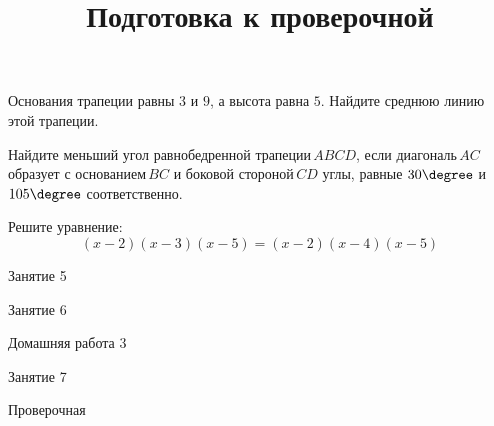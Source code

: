 \begin{homework}[number=2]
\begin{listofex}
		\item Основания трапеции равны \( 3 \) и \( 9 \), а высота равна \( 5 \). Найдите среднюю линию этой трапеции.
		\item Найдите меньший угол равнобедренной трапеции \( ABCD \), если диагональ \( AC \) образует с основанием \( BC \) и боковой стороной \( CD \) углы, равные \( 30\degree \) и \( 105\degree \) соответственно.
		\item Решите уравнение:
		\[(x-2)(x-3)(x-5)=(x-2)(x-4)(x-5)\]
	\end{listofex}
\end{homework}

\begin{class}[number=5]
	\begin{listofex}
		\item Занятие 5
	\end{listofex}
\end{class}

\begin{class}[number=6]
	\begin{listofex}
		\item Занятие 6
	\end{listofex}
\end{class}

\begin{homework}[number=3]
	\begin{listofex}
		\item Домашняя работа 3
	\end{listofex}
\end{homework}

\begin{class}[number=7]
	\title{Подготовка к проверочной}
	\begin{listofex}
		\item Занятие 7
	\end{listofex}
\end{class}

\begin{exam}
	\begin{listofex}
		\item Проверочная
	\end{listofex}
\end{exam}
